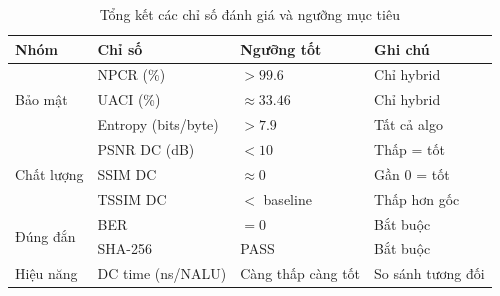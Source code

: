 \begin{table}[ht]
\centering
\caption{Tổng kết các chỉ số đánh giá và ngưỡng mục tiêu}
\label{tab:metrics_summary}
\begin{tabular}{llll}
\toprule
Nhóm & Chỉ số & Ngưỡng tốt & Ghi chú \\
\midrule
\multirow{3}{*}{Bảo mật} & NPCR (\%) & $> 99.6$ & Chỉ hybrid \\
 & UACI (\%) & $\approx 33.46$ & Chỉ hybrid \\
 & Entropy (bits/byte) & $> 7.9$ & Tất cả algo \\
\midrule
\multirow{3}{*}{Chất lượng} & PSNR DC (dB) & $< 10$ & Thấp = tốt \\
 & SSIM DC & $\approx 0$ & Gần 0 = tốt \\
 & TSSIM DC & $<$ baseline & Thấp hơn gốc \\
\midrule
\multirow{2}{*}{Đúng đắn} & BER & $= 0$ & Bắt buộc \\
 & SHA-256 & PASS & Bắt buộc \\
\midrule
Hiệu năng & DC time (ns/NALU) & Càng thấp càng tốt & So sánh tương đối \\
\bottomrule
\end{tabular}
\end{table}
